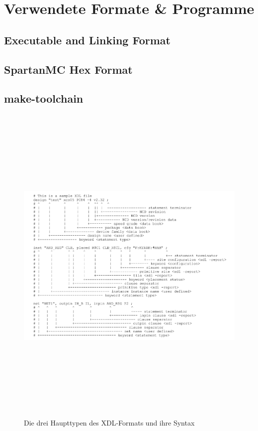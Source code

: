 \chapter{Verwendete Formate \& Programme}

\section{Executable and Linking Format}

\section{SpartanMC Hex Format}

\section{make-toolchain}

\begin{figure}
\centering
\includegraphics[height=16cm, angle=90]{./bilder/XDL}
\caption{Die drei Haupttypen des XDL-Formats und ihre Syntax}
\label{fig:XDL-Format}
\end{figure}